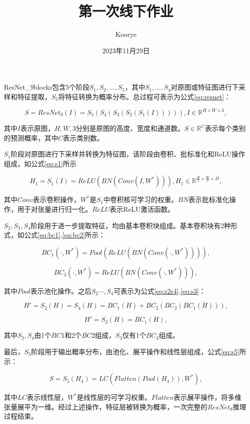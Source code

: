 \documentclass{article}
\title{第一次线下作业}
\date{2023年11月29日}
\author{Koorye}
\begin{document}
\maketitle

ResNet\_9blocks包含5个阶段$S_1,S_2,\dots,S_5$，其中$S_1,\dots,S_4$对原图或特征图进行下采样和特征提取，$S_5$将特征转换为概率分布。总过程可表示为公式\ref{eq:resnet}：

\begin{equation}
S=ResNet_9(I)=S_5(S_4(S_3(S_2(S_1(I))))),
I\in\mathbb{R}^{H\times W\times 3},
\label{eq:resnet}
\end{equation}

其中$I$表示原图，$H,W,3$分别是原图的高度、宽度和通道数。$S\in\mathbb{R}^{C}$表示每个类别的预测概率，其中$C$表示类别数。

$S_1$阶段对原图进行下采样并转换为特征图，该阶段由卷积、批标准化和ReLU操作组成，如公式\ref{eq:s1}所示

\begin{equation}
H_1=S_1(I)=ReLU(BN(Conv(I, W^*))), H_1\in\mathbb{R}^{\frac H2\times\frac W2\times D},
\label{eq:s1}
\end{equation}

其中$Conv$表示卷积操作，$W^*$是$S_1$中卷积核可学习的权重。$BN$表示批标准化操作，用于对张量进行归一化。$ReLU$表示ReLU激活函数。

$S_2,S_3,S_4$阶段用于进一步提取特征，均由基本卷积块组成。基本卷积块有2种形式，如公式\ref{eq:bc1},\ref{eq:bc2}所示：

\begin{equation}
BC_1(\cdot, W^*)=Pool(ReLU(BN(Conv(\cdot, W^*)))),
\label{eq:bc1}
\end{equation}

\begin{equation}
BC_2(\cdot, W^*)=ReLU(BN(Conv(\cdot, W^*))),
\label{eq:bc2}
\end{equation}

其中$Pool$表示池化操作。之后$S_2\cdots,S_4$可表示为公式\ref{eq:s2s4},\ref{eq:s3}：

\begin{equation}
H'=S_2(H)=S_4(H)=BC_1(H) + BC_2(BC_2(BC_1(H))),
\label{eq:s2s4}
\end{equation}

\begin{equation}
H'=S_3(H)=BC_1(H),
\label{eq:s3}
\end{equation}

其中$S_2,S_4$由1个$BC1$和2个$BC2$组成，$S_3$仅有1个$BC_3$组成。

最后，$S_5$阶段用于输出概率分布，由池化、展平操作和线性层组成，公式\ref{eq:s5}所示：

\begin{equation}
S=S_5(H_4)=LC(Flatten(Pool(H_4)),W^*),
\label{eq:s5}
\end{equation}

其中$LC$表示线性层，$W^*$是线性层的可学习权重。$Flatten$表示展平操作，将多维张量展平为一维。经过上述操作，特征层被转换为概率，一次完整的$ResNet_9$推理过程结束。
\end{document}
